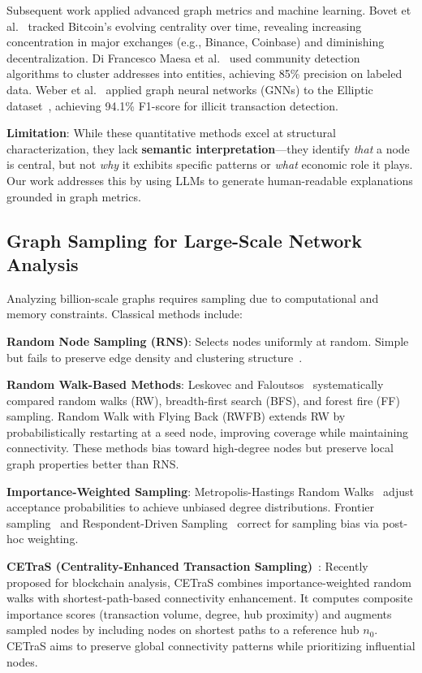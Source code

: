 Subsequent work applied advanced graph metrics and machine learning. Bovet et al.~\cite{bovet2019} tracked Bitcoin's evolving centrality over time, revealing increasing concentration in major exchanges (e.g., Binance, Coinbase) and diminishing decentralization. Di Francesco Maesa et al.~\cite{maesa2018} used community detection algorithms to cluster addresses into entities, achieving 85\% precision on labeled data. Weber et al.~\cite{weber2019} applied graph neural networks (GNNs) to the Elliptic dataset~\cite{elliptic2019}, achieving 94.1\% F1-score for illicit transaction detection.

\textbf{Limitation}: While these quantitative methods excel at structural characterization, they lack \textbf{semantic interpretation}---they identify \textit{that} a node is central, but not \textit{why} it exhibits specific patterns or \textit{what} economic role it plays. Our work addresses this by using LLMs to generate human-readable explanations grounded in graph metrics.

\subsection{Graph Sampling for Large-Scale Network Analysis}

Analyzing billion-scale graphs requires sampling due to computational and memory constraints. Classical methods include:

\textbf{Random Node Sampling (RNS)}: Selects nodes uniformly at random. Simple but fails to preserve edge density and clustering structure~\cite{leskovec2006sampling}.

\textbf{Random Walk-Based Methods}: Leskovec and Faloutsos~\cite{leskovec2006sampling} systematically compared random walks (RW), breadth-first search (BFS), and forest fire (FF) sampling. Random Walk with Flying Back (RWFB) extends RW by probabilistically restarting at a seed node, improving coverage while maintaining connectivity. These methods bias toward high-degree nodes but preserve local graph properties better than RNS.

\textbf{Importance-Weighted Sampling}: Metropolis-Hastings Random Walks~\cite{metropolis1953,ribeiro2010} adjust acceptance probabilities to achieve unbiased degree distributions. Frontier sampling~\cite{ribeiro2012} and Respondent-Driven Sampling~\cite{heckathorn1997} correct for sampling bias via post-hoc weighting.

\textbf{CETraS (Centrality-Enhanced Transaction Sampling)}~\cite{lei2025llm}: Recently proposed for blockchain analysis, CETraS combines importance-weighted random walks with shortest-path-based connectivity enhancement. It computes composite importance scores (transaction volume, degree, hub proximity) and augments sampled nodes by including nodes on shortest paths to a reference hub $n_0$. CETraS aims to preserve global connectivity patterns while prioritizing influential nodes.

